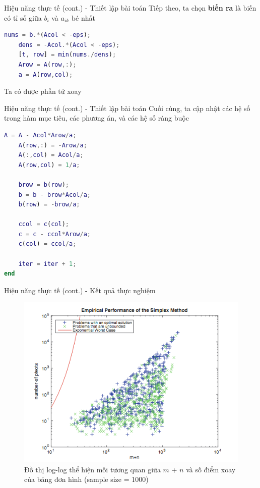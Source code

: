 \documentclass[10pt]{beamer}
\begin{document}
\begin{frame}[fragile]{Hiệu năng thực tế (cont.) - Thiết lập bài toán}
Tiếp theo, ta chọn \textbf{biến ra} là biến có tỉ số giữa $b_i$ và $a_{ik}$ bé nhất
\begin{lstlisting}[language=Matlab]
    nums = b.*(Acol < -eps);
    dens = -Acol.*(Acol < -eps);
    [t, row] = min(nums./dens);
    Arow = A(row,:);
    a = A(row,col);
\end{lstlisting}
Ta có được phần tử xoay
\end{frame}

\begin{frame}[fragile]{Hiệu năng thực tế (cont.) - Thiết lập bài toán}
Cuối cùng, ta cập nhật các hệ số trong hàm mục tiêu, các phương án, và các hệ số ràng buộc
\begin{lstlisting}[language=Matlab]
    A = A - Acol*Arow/a;
    A(row,:) = -Arow/a;
    A(:,col) = Acol/a;
    A(row,col) = 1/a;
    
    brow = b(row);
    b = b - brow*Acol/a;
    b(row) = -brow/a;
    
    ccol = c(col);
    c = c - ccol*Arow/a;
    c(col) = ccol/a;
    
    iter = iter + 1;
end
\end{lstlisting}
\end{frame}

\begin{frame}[fragile]{Hiệu năng thực tế (cont.) - Kết quả thực nghiệm}
\begin{figure}
\includegraphics[scale=.5]{img/plot_1.png}
\caption{Đồ thị log-log thể hiện mối tương quan giữa $m$ + $n$ và số điểm xoay của bảng đơn hình (sample size = 1000)}
\end{figure}
\end{frame}
\end{document}
